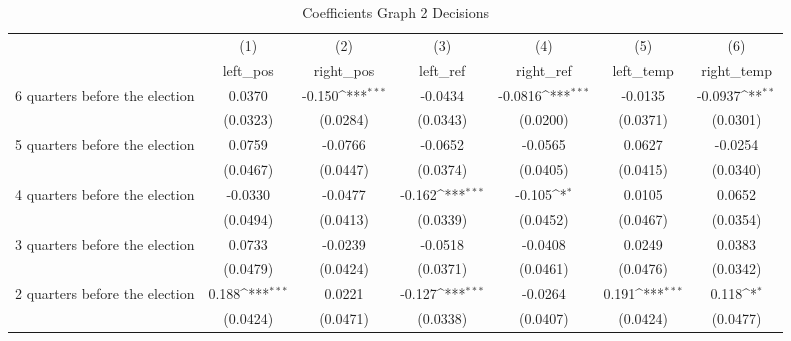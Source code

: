 \begin{table}[htbp]\centering
\def\sym#1{\ifmmode^{#1}\else\(^{#1}\)\fi}
\caption{Coefficients Graph 2 Decisions}
\begin{tabular}{l*{6}{c}}
\hline\hline
                    &\multicolumn{1}{c}{(1)}&\multicolumn{1}{c}{(2)}&\multicolumn{1}{c}{(3)}&\multicolumn{1}{c}{(4)}&\multicolumn{1}{c}{(5)}&\multicolumn{1}{c}{(6)}\\
                    &\multicolumn{1}{c}{left\_pos}&\multicolumn{1}{c}{right\_pos}&\multicolumn{1}{c}{left\_ref}&\multicolumn{1}{c}{right\_ref}&\multicolumn{1}{c}{left\_temp}&\multicolumn{1}{c}{right\_temp}\\
\hline
 6 quarters before the election&      0.0370         &      -0.150\sym{***}&     -0.0434         &     -0.0816\sym{***}&     -0.0135         &     -0.0937\sym{**} \\
                    &    (0.0323)         &    (0.0284)         &    (0.0343)         &    (0.0200)         &    (0.0371)         &    (0.0301)         \\
[1em]
 5 quarters before the election&      0.0759         &     -0.0766         &     -0.0652         &     -0.0565         &      0.0627         &     -0.0254         \\
                    &    (0.0467)         &    (0.0447)         &    (0.0374)         &    (0.0405)         &    (0.0415)         &    (0.0340)         \\
[1em]
 4 quarters before the election&     -0.0330         &     -0.0477         &      -0.162\sym{***}&      -0.105\sym{*}  &      0.0105         &      0.0652         \\
                    &    (0.0494)         &    (0.0413)         &    (0.0339)         &    (0.0452)         &    (0.0467)         &    (0.0354)         \\
[1em]
 3 quarters before the election&      0.0733         &     -0.0239         &     -0.0518         &     -0.0408         &      0.0249         &      0.0383         \\
                    &    (0.0479)         &    (0.0424)         &    (0.0371)         &    (0.0461)         &    (0.0476)         &    (0.0342)         \\
[1em]
 2 quarters before the election&       0.188\sym{***}&      0.0221         &      -0.127\sym{***}&     -0.0264         &       0.191\sym{***}&       0.118\sym{*}  \\
                    &    (0.0424)         &    (0.0471)         &    (0.0338)         &    (0.0407)         &    (0.0424)         &    (0.0477)         \\

\end{tabular}
\end{table}
